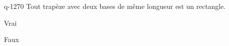 \begin{truefalse}{q-1270}
Tout trapèze avec deux bases de même longueur est un rectangle.
\item Vrai
\item* Faux
\end{truefalse}

